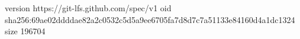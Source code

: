 version https://git-lfs.github.com/spec/v1
oid sha256:69ae02ddddae82a2c0532c5d5a9ee6705fa7d8d7c7a51133e84160d4a1dc1324
size 196704
